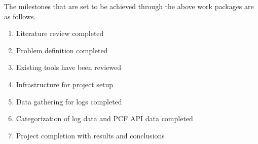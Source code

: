 The milestones that are set to be achieved through the above work packages are as follows.

\begin{enumerate}
  \item Literature review completed
  \item Problem definition completed
  \item Existing tools have been reviewed 
  \item Infrastructure for project setup 
  \item Data gathering for logs completed
  \item Categorization of log data and PCF API data completed
  \item Project completion with results and conclusions
\end{enumerate}